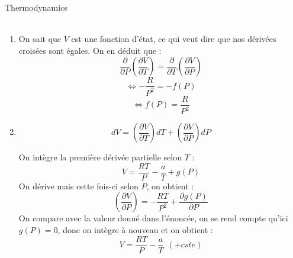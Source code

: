 \begin{example}

{\color{white}Thermodynamics}\\

\\


\begin{enumerate}

\item On sait que $V$ est une fonction d'état, ce qui veut dire que nos dérivées croisées sont égales. On en déduit que :
$$\frac{\partial}{\partial P} \left ( \frac{\partial V}{\partial T} \right ) = \frac{\partial}{\partial T} \left ( \frac{\partial V}{\partial P} \right )$$
$$\Leftrightarrow - \frac{R}{P^2}=-f(P)$$
$$\Leftrightarrow f(P)=\frac{R}{P^2}$$

\item 

$$dV =  \left ( \frac{\partial V}{\partial T} \right ) dT + \left ( \frac{\partial V}{\partial P} \right ) dP$$

On intègre la première dérivée partielle selon $T$ : 
$$ V = \frac{RT}{P} - \frac{a}{T}+g(P)$$
On dérive mais cette fois-ci selon $P$, on obtient :
$$ \left ( \frac{\partial V}{\partial P} \right ) = -\frac{RT}{P^2}+\frac{\partial g(P)}{\partial P}$$
 On compare avec la valeur donné dans l'énoncée, on se rend compte qu'ici $g(P)=0$, donc on intègre à nouveau et on obtient :
$$V = \frac{RT}{P}-\frac{a}{T}~~(+cste)$$

\end{enumerate}
\end{example}
